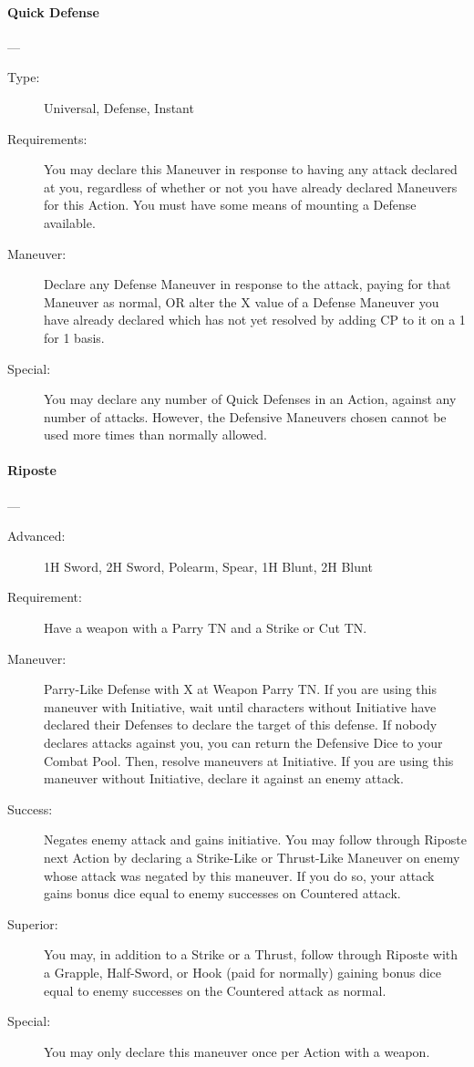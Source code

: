 \documentclass[oneside,11pt,english]{book}
\begin{document}
\paragraph{\large\label{man:Quick Defense}Quick Defense}---\quad{\large[2]}
\vspace{-10pt}\begin{description} 
\item [Type:] Universal, Defense, Instant 
\item [Requirements:] You may declare this Maneuver in response to having any attack declared at you, 
  regardless of whether or not you have already declared Maneuvers for this Action. You must have some 
  means of mounting a Defense available. 
\item [Maneuver:] Declare any Defense Maneuver in response to the attack, paying for that Maneuver as 
  normal, OR alter the X value of a Defense Maneuver you have already declared which has not yet 
  resolved by adding CP to it on a 1 for 1 basis. 
\item [Special:] You may declare any number of Quick Defenses in an Action, against any number of attacks. 
  However, the Defensive Maneuvers chosen cannot be used more times than normally allowed. 
\end{description}

\paragraph{\large\label{man:Riposte}Riposte}---\quad{\large[2+X]}
\vspace{-10pt}\begin{description}
\item [Advanced:] 1H Sword, 2H Sword, Polearm, Spear, 1H Blunt, 2H Blunt %
\item [Requirement:] Have a weapon with a Parry TN and a Strike or Cut TN. 
\item [Maneuver:] Parry-Like Defense with X at Weapon Parry TN. 
  If you are using this maneuver with Initiative, wait until characters without Initiative have declared their 
  Defenses to declare the target of this defense. If nobody declares attacks against you, you can return the 
  Defensive Dice to your Combat Pool. Then, resolve maneuvers at Initiative. 
  If you are using this maneuver without Initiative, declare it against an enemy attack. 
\item [Success:] Negates enemy attack and gains initiative. You may follow through Riposte next Action by 
  declaring a Strike-Like or Thrust-Like Maneuver on enemy whose attack was negated by this maneuver. 
  If you do so, your attack gains bonus dice equal to enemy successes on Countered attack. 
\item [Superior:] You may, in addition to a Strike or a Thrust, follow through Riposte with a Grapple, 
  Half-Sword, or Hook (paid for normally) gaining bonus dice equal to enemy successes on the Countered 
  attack as normal. 
\item [Special:] You may only declare this maneuver once per Action with a weapon. 
\end{description}
\end{document}
